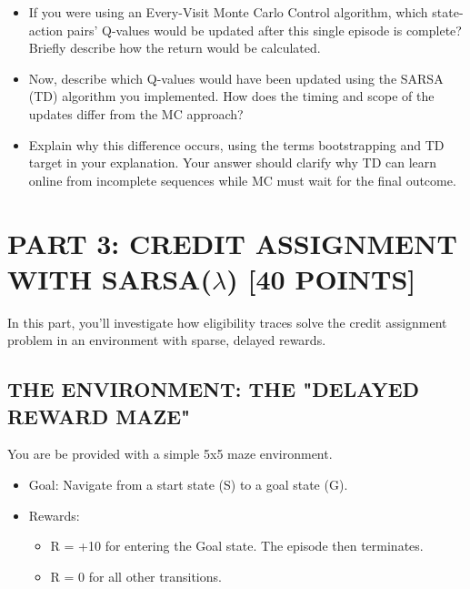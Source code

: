 \documentclass{article}
\begin{document}
\begin{itemize}
    \item If you were using an Every-Visit Monte Carlo Control algorithm, which state-action pairs' Q-values would be updated after this single episode is complete? Briefly describe how the return would be calculated.
    
    
    \item Now, describe which Q-values would have been updated using the SARSA (TD) algorithm you implemented. How does the timing and scope of the updates differ from the MC approach?
    
    
    \item Explain why this difference occurs, using the terms bootstrapping and TD target in your explanation. Your answer should clarify why TD can learn online from incomplete sequences while MC must wait for the final outcome.
    
\end{itemize}

\section{PART 3: CREDIT ASSIGNMENT WITH SARSA($\lambda$) [40 POINTS]}

In this part, you'll investigate how eligibility traces solve the credit assignment problem in an environment with sparse, delayed rewards.

\subsection{THE ENVIRONMENT: THE "DELAYED REWARD MAZE"}

You are be provided with a simple 5x5 maze environment.

\begin{itemize}
    \item Goal: Navigate from a start state (S) to a goal state (G).
    \item Rewards:
    \begin{itemize}
        \item R = +10 for entering the Goal state. The episode then terminates.
        \item R = 0 for all other transitions.
    \end{itemize}
\end{itemize}
\end{document}
